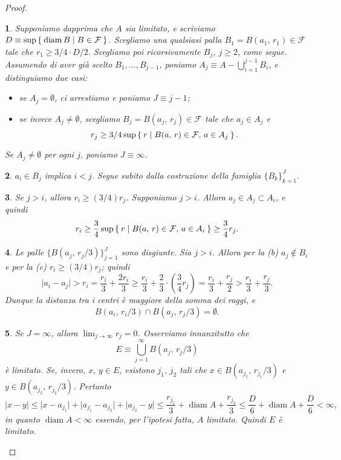 \documentclass[a4paper,10pt,openright,oneside]{book}
\theoremstyle{theoremstyle}
\theoremstyle{theoremstylewoheader}
\theoremstyle{theoremstyle}
\theoremstyle{proofsecstyle}
\newtheorem{proofsec}{}
\theoremstyle{nonumberplain}
\newtheorem{proof}{Dim.}
\newcommand{\FF}{\ensuremath{\mathcal{F}}}
\newcommand{\abs}[1]{\ensuremath{\lvert #1 \rvert}}
\DeclareMathOperator{\diam}{diam}
\begin{document}
\begin{proof}
\begin{proofsec}
Supponiamo dapprima che $A$ sia limitato, e scriviamo $D \equiv \sup\Set{ \diam B | B \in \FF }$. Scegliamo una qualsiasi palla $B_1 = B(a_1,\, r_1) \in \FF$ tale che $r_1 \ge 3/4 \cdot D/2$. Scegliamo poi ricorsivamente $B_j$, $j \ge 2$, come segue. Assumendo di aver già scelto $B_1, \ldots, B_{j-1}$, poniamo $A_j \equiv A - \bigcup_{i=1}^{j-1} B_i$, e distinguiamo due casi:
\begin{itemize}
\item[($\alpha)$] se $A_j = \emptyset$, ci arrestiamo e poniamo $J \equiv j - 1$;
\item[($\beta)$] se invece $A_j \ne \emptyset$, scegliamo $B_j = B(a_j,\, r_j) \in \FF$ tale che $a_j \in A_j$ e
\[
r_j \ge 3/4 \sup\Set{ r | B(a,\, r) \in \FF,\, a \in A_j }.
\]
\end{itemize}
Se $A_j \ne \emptyset$ per ogni $j$, poniamo $J \equiv \infty$.
\end{proofsec}

\begin{proofsec}
\emph{$a_i \in B_j$ implica $i < j$.}\hspace{.5em} Segue subito dalla costruzione della famiglia $\{B_k\}_{k=1}^J$.
\end{proofsec}

\begin{proofsec}
\emph{Se $j > i$, allora $r_i \ge (3/4)r_j$.}\hspace{.5em} Supponiamo $j > i$. Allora $a_j \in A_j \subset A_i$, e quindi
\[
r_i \ge \frac{3}{4} \sup\Set{ r | B(a,\, r) \in \FF,\, a \in A_i } \ge \frac{3}{4}r_j.
\]
\end{proofsec}

\begin{proofsec}
\emph{Le palle $\{B(a_j,\, r_j/3)\}_{j=1}^J$ sono disgiunte.}\hspace{.5em} Sia $j > i$. Allora per la (b) $a_j \notin B_i$ e per la (c) $r_i \ge (3/4)r_j$; quindi
\[
\abs{a_i - a_j} > r_i = \frac{r_i}{3} + \frac{2r_i}{3} \ge \frac{r_i}{3} + \frac{2}{3} \cdot \left(\frac{3}{4} r_j\right) = \frac{r_i}{3} + \frac{r_j}{2} > \frac{r_i}{3} + \frac{r_j}{3}.
\]
Dunque la distanza tra i centri è maggiore della somma dei raggi, e
\[
B(a_i,\, r_i/3) \cap B(a_j,\, r_j/3) = \emptyset.
\]
\end{proofsec}

\begin{proofsec}
\emph{Se $J = \infty$, allora $\lim_{j \to \infty} r_j = 0$.}\hspace{.5em} Osserviamo innanzitutto che
\[
E \equiv \bigcup_{j=1}^\infty B(a_j,\, r_j/3)
\]
è limitato. Se, invero, $x,\, y \in E$, esistono $j_1,\, j_2$ tali che $x \in B(a_{j_1},\, r_{j_1}/3)$ e $y \in B(a_{j_2},\, r_{j_2}/3)$. Pertanto
\[
\abs{x - y} \le \abs{x - a_{j_1}} + \abs{a_{j_1} - a_{j_2}} + \abs{a_{j_2} - y} \le \frac{r_{j_1}}{3} + \diam A + \frac{r_{j_2}}{3} \le \frac{D}{6} + \diam A + \frac{D}{6} < \infty,
\]
in quanto $\diam A < \infty$ essendo, per l'ipotesi fatta, $A$ limitato. Quindi $E$ è limitato.


\end{proofsec}
\end{proof}
\end{document}
